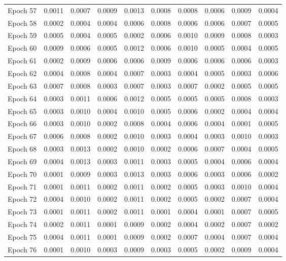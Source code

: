 \begin{table}[htbp]
\begin{tabular}{|l|l|l|l|l|l|l|l|l|l|}
Epoch 57 & 0.0011 & 0.0007 & 0.0009 & 0.0013 & 0.0008 & 0.0008 & 0.0006 & 0.0009 & 0.0004  \\
Epoch 58 & 0.0002 & 0.0004 & 0.0004 & 0.0006 & 0.0008 & 0.0006 & 0.0006 & 0.0007 & 0.0005  \\
Epoch 59 & 0.0005 & 0.0004 & 0.0005 & 0.0002 & 0.0006 & 0.0010 & 0.0009 & 0.0008 & 0.0003  \\
Epoch 60 & 0.0009 & 0.0006 & 0.0005 & 0.0012 & 0.0006 & 0.0010 & 0.0005 & 0.0004 & 0.0005  \\
Epoch 61 & 0.0002 & 0.0009 & 0.0006 & 0.0006 & 0.0009 & 0.0006 & 0.0006 & 0.0006 & 0.0003  \\
Epoch 62 & 0.0004 & 0.0008 & 0.0004 & 0.0007 & 0.0003 & 0.0004 & 0.0005 & 0.0003 & 0.0006  \\
Epoch 63 & 0.0007 & 0.0008 & 0.0003 & 0.0007 & 0.0003 & 0.0007 & 0.0002 & 0.0005 & 0.0005  \\
Epoch 64 & 0.0003 & 0.0011 & 0.0006 & 0.0012 & 0.0005 & 0.0005 & 0.0005 & 0.0008 & 0.0003  \\
Epoch 65 & 0.0003 & 0.0010 & 0.0004 & 0.0010 & 0.0005 & 0.0006 & 0.0002 & 0.0004 & 0.0004  \\
Epoch 66 & 0.0003 & 0.0010 & 0.0002 & 0.0008 & 0.0004 & 0.0006 & 0.0004 & 0.0001 & 0.0005  \\
Epoch 67 & 0.0006 & 0.0008 & 0.0002 & 0.0010 & 0.0003 & 0.0004 & 0.0003 & 0.0010 & 0.0003  \\
Epoch 68 & 0.0003 & 0.0013 & 0.0002 & 0.0010 & 0.0002 & 0.0006 & 0.0007 & 0.0004 & 0.0005  \\
Epoch 69 & 0.0004 & 0.0013 & 0.0003 & 0.0011 & 0.0003 & 0.0005 & 0.0004 & 0.0006 & 0.0004  \\
Epoch 70 & 0.0001 & 0.0009 & 0.0003 & 0.0013 & 0.0003 & 0.0006 & 0.0003 & 0.0006 & 0.0002  \\
Epoch 71 & 0.0001 & 0.0011 & 0.0002 & 0.0011 & 0.0002 & 0.0005 & 0.0003 & 0.0010 & 0.0004  \\
Epoch 72 & 0.0004 & 0.0010 & 0.0002 & 0.0011 & 0.0002 & 0.0005 & 0.0002 & 0.0007 & 0.0004  \\
Epoch 73 & 0.0001 & 0.0011 & 0.0002 & 0.0011 & 0.0001 & 0.0004 & 0.0001 & 0.0007 & 0.0005  \\
Epoch 74 & 0.0002 & 0.0011 & 0.0001 & 0.0009 & 0.0002 & 0.0004 & 0.0002 & 0.0007 & 0.0002  \\
Epoch 75 & 0.0004 & 0.0011 & 0.0001 & 0.0009 & 0.0002 & 0.0007 & 0.0004 & 0.0007 & 0.0004  \\
Epoch 76 & 0.0001 & 0.0010 & 0.0003 & 0.0009 & 0.0003 & 0.0005 & 0.0002 & 0.0009 & 0.0004  \\

\end{tabular}
\end{table}
